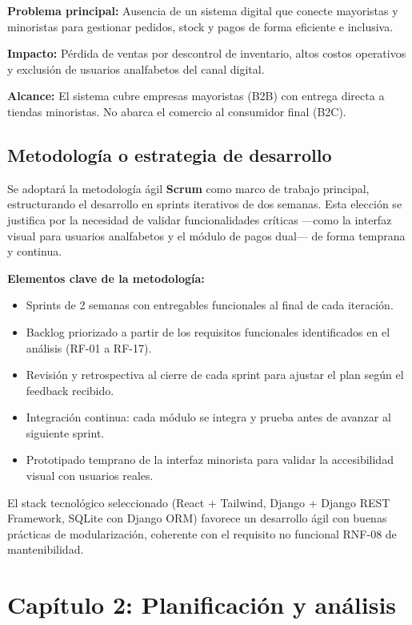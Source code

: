 \documentclass[12pt, a4paper]{article}
\begin{document}
\textbf{Problema principal:} Ausencia de un sistema digital que conecte mayoristas y minoristas para gestionar pedidos, stock y pagos de forma eficiente e inclusiva.

\textbf{Impacto:} Pérdida de ventas por descontrol de inventario, altos costos operativos y exclusión de usuarios analfabetos del canal digital.

\textbf{Alcance:} El sistema cubre empresas mayoristas (B2B) con entrega directa a tiendas minoristas. No abarca el comercio al consumidor final (B2C).

\subsection{Metodología o estrategia de desarrollo}

Se adoptará la metodología ágil \textbf{Scrum} como marco de trabajo principal, estructurando el desarrollo en sprints iterativos de dos semanas. Esta elección se justifica por la necesidad de validar funcionalidades críticas ---como la interfaz visual para usuarios analfabetos y el módulo de pagos dual--- de forma temprana y continua.

\textbf{Elementos clave de la metodología:}

\begin{itemize}
  \item Sprints de 2 semanas con entregables funcionales al final de cada iteración.
  \item Backlog priorizado a partir de los requisitos funcionales identificados en el análisis (RF-01 a RF-17).
  \item Revisión y retrospectiva al cierre de cada sprint para ajustar el plan según el feedback recibido.
  \item Integración continua: cada módulo se integra y prueba antes de avanzar al siguiente sprint.
  \item Prototipado temprano de la interfaz minorista para validar la accesibilidad visual con usuarios reales.
\end{itemize}

El stack tecnológico seleccionado (React + Tailwind, Django + Django REST Framework, SQLite con Django ORM) favorece un desarrollo ágil con buenas prácticas de modularización, coherente con el requisito no funcional RNF-08 de mantenibilidad.

\section{Capítulo 2: Planificación y análisis}
\end{document}
